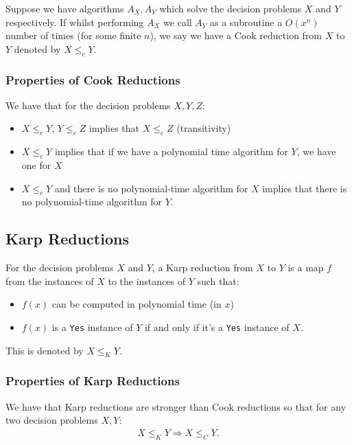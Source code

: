 Suppose we have algorithms $A_X, A_Y$ which solve the decision problems 
$X$ and $Y$ respectively. If whilst performing $A_X$ we call $A_Y$ as a 
subroutine a $O(x^n)$ number of times (for some finite $n$), we say
we have a Cook reduction from $X$ to $Y$ denoted by $X \leq_c Y$.

\newpage

\subsubsection{Properties of Cook Reductions}

We have that for the decision problems $X, Y, Z$: \begin{itemize}
  \item $X \leq_c Y$, $Y \leq_c Z$ implies that $X \leq_c Z$ (transitivity)
  \item $X \leq_c Y$ implies that if we have a polynomial time algorithm for $Y$, 
  we have one for $X$
  \item $X \leq_c Y$ and there is no polynomial-time algorithm for $X$ implies 
  that there is no polynomial-time algorithm for $Y$.
\end{itemize}

\subsection{Karp Reductions}

For the decision problems $X$ and $Y$, a Karp reduction from $X$ to $Y$
is a map $f$ from the instances of $X$ to the instances of $Y$ such that:
\begin{itemize}
  \item $f(x)$ can be computed in polynomial time (in $x$)
  \item $f(x)$ is a \texttt{Yes} instance of $Y$ if and only if it's a \texttt{Yes} instance
  of $X$.
\end{itemize} This is denoted by $X \leq_K Y$.

\subsubsection{Properties of Karp Reductions}

We have that Karp reductions are stronger than Cook reductions so that for any two
decision problems $X, Y$: \begin{gather*}
    X \leq_K Y \Rightarrow X \leq_C Y.
\end{gather*}

